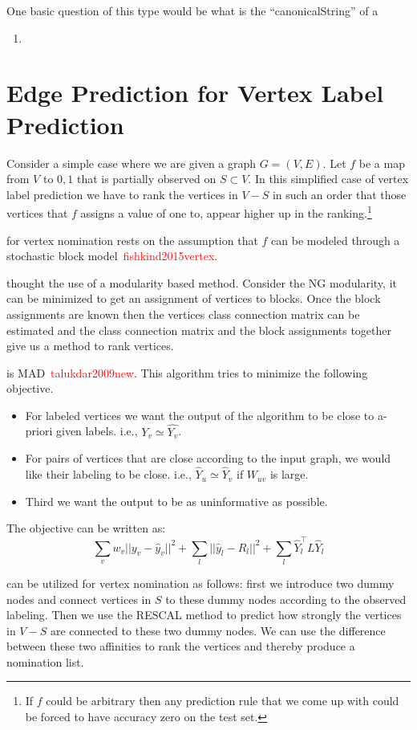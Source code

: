 \documentclass{tufte-handout}
\newcommand{\ie}{i.e.,\xspace}
\renewcommand{\cite}[1]{\textcolor{red}{#1}}
\begin{document}
One basic question of this type would be what is the ``canonicalString'' of a
\begin{enumerate}
\item
\end{enumerate}


\section{Edge Prediction for Vertex Label Prediction}
\label{sec:edge-for-vertex}
Consider a simple case where we are given a graph $G = (V, E)$.
Let $f$ be a map from $V$ to ${0, 1}$ that is partially observed on $S \subset V$.
In this simplified case of vertex label prediction we have to rank the vertices in $V-S$
in such an order that those vertices that $f$ assigns a value of one to, appear higher up in the
ranking.\footnote{If $f$ could be arbitrary then any prediction rule that we come up with could be
forced to have accuracy zero on the test set.}

 for vertex nomination rests on the assumption that $f$ can be
modeled through a stochastic block model~\cite{fishkind2015vertex}.

 thought the use of a modularity based method.
Consider the NG modularity, it can be minimized to get an assignment of vertices to
blocks. Once the block assignments are known then the vertices class connection matrix
can be estimated and the class connection matrix and the block assignments together
give us a method to rank vertices.

 is MAD~\cite{talukdar2009new}.
This algorithm tries to minimize the following objective.
\begin{itemize}
\item For labeled vertices we want the output of the algorithm to be close to a-priori given labels. \ie{} $Y_v \simeq \hat{Y_v}$.
\item For pairs of vertices that are close according to the input graph, we would like their labeling to be close. \ie{} $\hat{Y}_u \simeq \hat{Y}_v$ if $W_{uv}$ is large.
\item Third we want the output to be as uninformative as possible.
\end{itemize}
The objective can be written as:
$$ \sum_{v} w_v || y_v - \hat{y}_v ||^2 + \sum_l ||\hat{y}_l - R_l ||^2 + \sum_l \hat{Y}_l^\intercal L \hat{Y}_l $$

 can be utilized for vertex nomination
as follows: first we introduce two dummy nodes and connect vertices in $S$
to these dummy nodes according to the observed labeling. Then we use the RESCAL
method to predict how strongly the vertices in $V-S$ are connected to these two
dummy nodes. We can use the difference between these two affinities to rank the
vertices and thereby produce a nomination list.
\end{document}
